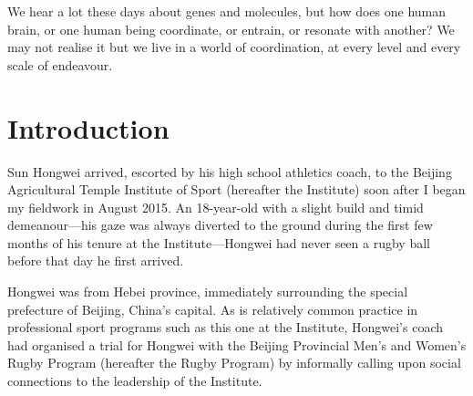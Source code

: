 
\begin{savequote}[8cm]

    We hear a lot these days about genes and molecules, but how does one human brain, or one human being coordinate, or entrain, or resonate with another?  We may not realise it but we live in a world of coordination, at every level and every scale of endeavour.

\end{savequote}

\chapter{\label{introduction}Introduction}



\minitoc

Sun Hongwei arrived, escorted by his high school athletics coach, to the Beijing Agricultural Temple Institute of Sport (hereafter the Institute) soon after I began my fieldwork in August 2015.  An 18-year-old with a slight build and timid demeanour---his gaze was always diverted to the ground during the first few months of his tenure at the Institute---Hongwei had never seen a rugby ball before that day he first arrived.

Hongwei was from Hebei province, immediately surrounding the special prefecture of Beijing, China's capital.  As is relatively common practice in professional sport programs such as this one at the Institute, Hongwei's coach had organised a trial for Hongwei with the Beijing Provincial Men’s and Women's Rugby Program (hereafter the Rugby Program) by informally calling upon social connections to the leadership of the Institute.

